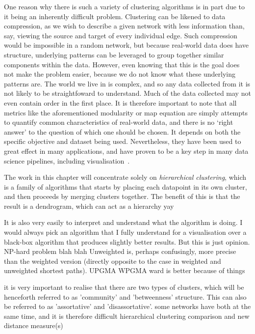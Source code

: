 One reason why there is such a variety of clustering algorithms is in part due to it being an inherently difficult problem.
Clustering can be likened to data compression, as we wish to describe a given network with less information than, say, viewing the source and target of every individual edge. Such compression would be impossible in a random network, but because real-world data does have structure, underlying patterns can be leveraged to group together similar components within the data.
However, even knowing that this is the goal does not make the problem easier, because we do not know what these underlying patterns are. The world we live in is complex, and so any data collected from it is not likely to be straightfoward to understand. Much of the data collected may not even contain order in the first place.
It is therefore important to note that all metrics like the aforementioned modularity or map equation are simply attempts to quantify common characteristics of real-world data, and there is no `right answer' to the question of which one should be chosen. It depends on both the specific objective and dataset being used. Nevertheless, they have been used to great effect in many applications, and have proven to be a key step in many data science pipelines, including visualisation~\cite{TODO}.

The work in this chapter will concentrate solely on \textit{hierarchical clustering}, which is a family of algorithms that starts by placing each datapoint in its own cluster, and then proceeds by merging clusters together. 
The benefit of this is that the result is a dendrogram, which can act as a hierarchy yay

It is also very easily to interpret and understand what the algorithm is doing. I would always pick an algorithm that I fully understand for a visualisation over a black-box algorithm that produces slightly better results. But this is just opinion.
NP-hard problem blah blah
Unweighted is, perhaps confusingly, more precise than the weighted version (directly opposite to the case in weighted and unweighted shortest paths). 
UPGMA WPGMA ward is better because of things

it is very important to realise that there are two types of clusters, which will be henceforth referred to as 'community' and 'betweenness' structure. This can also be referred to as 'assortative' and 'disassortative'.
some networks have both at the same time, and it is therefore difficult 
hierarchical clustering comparison and new distance measure(s)

